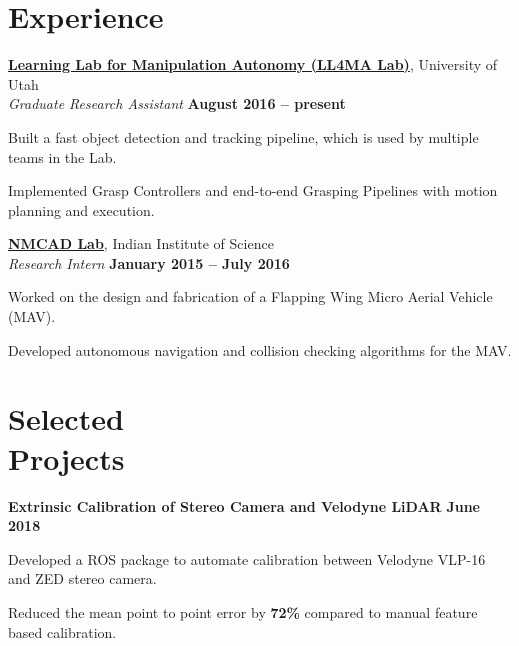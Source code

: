 \documentclass[letterpaper, margin, line, 10.5pt]{resume}
\begin{document}
\begin{resume}
    
    \sectionseperator
    \section{\myheadingstyle Experience}

    \href{https://robot-learning.cs.utah.edu}{\textbf{Learning Lab for Manipulation Autonomy (LL4MA Lab)}}, University of Utah \vspace{1pt}\\\vspace{1pt}%
    \textsl{Graduate Research Assistant} \hfill \textbf{August 2016 -- present}\\ \vspace{-4.5mm}
	\begin{list2}
		\item Built a fast object detection and tracking pipeline, which is used by multiple teams in the Lab.
		\item Implemented Grasp Controllers and end-to-end Grasping Pipelines with motion planning and execution.
	\end{list2}\vspace{-2.25mm}

    \href{http://www.aero.iisc.ernet.in/~dinesh/web/}{\textbf{NMCAD Lab}}, Indian Institute of Science \vspace{1pt}\\\vspace{1pt}%
    \textsl{Research Intern} \hfill \textbf{January 2015 -- July 2016}\\ \vspace{-4.5mm}
    \begin{list2}
    	\item Worked on the design and fabrication of a Flapping Wing Micro Aerial Vehicle (MAV).
    	\item Developed autonomous navigation and collision checking algorithms for the MAV.
    \end{list2}\vspace{-0.1mm}


    
	\sectionseperator
	\section{\myheadingstyle Selected \\ Projects}
	\textbf{Extrinsic Calibration of Stereo Camera and Velodyne LiDAR} \hfill \textbf{June 2018}
	\begin{list2}
		\item Developed a ROS package to automate calibration between Velodyne VLP-16 and ZED stereo camera.
		\item Reduced the mean point to point error by \textbf{72\%} compared to manual feature based calibration.
	\end{list2}\vspace{-3.2mm}
	

\end{resume}
\end{document}
